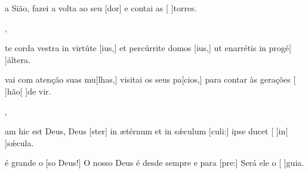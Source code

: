 {        {\item {} a Sião, fazei a volta ao seu [dor] e contai as [ ]{tor}res.},
    {\item {}te corda vestra in virtúte [ius,] et percúrrite domos [ius,] ut enarrétis in progé[ ]{ál}tera.}%
        {\item {}vai com atenção suas mu[lhas,] visitai os seus pa[cios,] para contar às gerações [ ]{hão}[ ]{de} vir.},
    {\item {}am hic est Deus, Deus [ster] in ætérnum et in sǽculum [culi:] ipse ducet [ ]{in}[ ]{sǽ}cula.}%
        {\item {} é grande o [so Deus!] O nosso Deus é desde sempre e para [pre:] Será ele o [ ]{gui}a.}
}